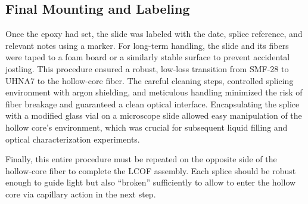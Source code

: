 \subsection{Final Mounting and Labeling}

Once the epoxy had set, the slide was labeled with the date, splice reference, and relevant notes using a marker. For long-term handling, the slide and its fibers were taped to a foam board or a similarly stable surface to prevent accidental jostling. This procedure ensured a robust, low-loss transition from \ac{SMF-28} to \ac{UHNA7} to the hollow-core fiber. The careful cleaning steps, controlled splicing environment with argon shielding, and meticulous handling minimized the risk of fiber breakage and guaranteed a clean optical interface. Encapsulating the splice with a modified glass vial on a microscope slide allowed easy manipulation of the hollow core’s environment, which was crucial for subsequent liquid filling and optical characterization experiments.

Finally, this entire procedure must be repeated on the opposite side of the hollow-core fiber to complete the \ac{LCOF} assembly. Each splice should be robust enough to guide light but also “broken” sufficiently to allow  to enter the hollow core via capillary action in the next step.

